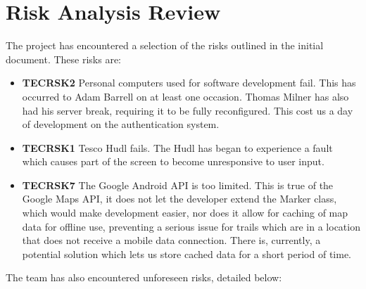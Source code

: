 \documentclass[11pt,a4paper]{article}
\begin{document}

\section{Risk Analysis Review}
The project has encountered a selection of the risks outlined in the initial document. These risks are:
\begin{itemize}
\item\textbf{TECRSK2} Personal computers used for software development fail. This has occurred to Adam Barrell on at least one occasion. Thomas Milner has also had his server break, requiring it to be fully reconfigured. This cost us a day of development on the authentication system.
\item\textbf{TECRSK1} Tesco Hudl fails. The Hudl has began to experience a fault which causes part of the screen to become unresponsive to user input.
\item\textbf{TECRSK7} The Google Android API is too limited. This is true of the Google Maps API, it does not let the developer extend the Marker class, which would make development easier, nor does it allow for caching of map data for offline use, preventing a serious issue for trails which are in a location that does not receive a mobile data connection. There is, currently, a potential solution which lets us store cached data for a short period of time.
\end{itemize}
The team has also encountered unforeseen risks, detailed below:
\end{document}
